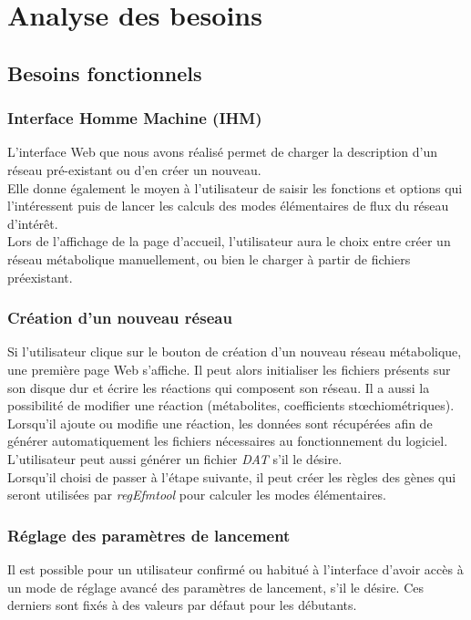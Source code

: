 \section{Analyse des besoins}

\subsection{Besoins fonctionnels}

\subsubsection{Interface Homme Machine (IHM)}
L'interface Web que nous avons réalisé permet de charger la description d'un réseau pré-existant ou d'en créer un nouveau.\\
Elle donne également le moyen à l'utilisateur de saisir les fonctions et options qui l'intéressent puis de lancer les calculs des modes élémentaires de flux du réseau d'intérêt.\\ 

Lors de l'affichage de la page d'accueil, l'utilisateur aura le choix entre créer un réseau métabolique manuellement, ou bien le charger à partir de fichiers préexistant. 

\subsubsection{Création d'un nouveau réseau}
Si l'utilisateur clique sur le bouton de création d'un nouveau réseau métabolique, une première page Web s'affiche. Il peut alors initialiser les fichiers présents sur son disque dur et écrire les réactions qui composent son réseau. Il a aussi la possibilité de modifier une réaction (métabolites, coefficients stœchiométriques). Lorsqu'il ajoute ou modifie une réaction, les données sont récupérées afin de générer automatiquement les fichiers nécessaires au fonctionnement du logiciel.
L'utilisateur peut aussi générer un fichier \emph{DAT} s'il le désire.\\
Lorsqu'il choisi de passer à l'étape suivante, il peut créer les règles des gènes qui seront utilisées par \emph{regEfmtool} pour calculer les modes élémentaires.

\subsubsection{Réglage des paramètres de lancement}
Il est possible pour un utilisateur confirmé ou habitué à l'interface d'avoir accès à un mode de réglage avancé des paramètres de lancement, s'il le désire. Ces derniers sont fixés à des valeurs par défaut pour les débutants. 

